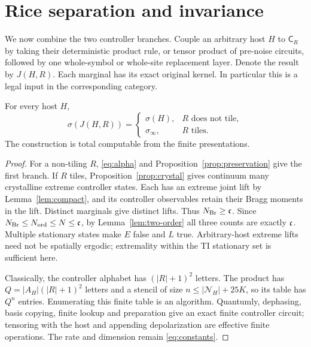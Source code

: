 \section{Rice separation and invariance}\label{sec:rice}
We now combine the two controller branches. Couple an arbitrary host $H$ to $\mathsf C_R$ by taking their deterministic product rule, or tensor product of pre-noise circuits, followed by one whole-symbol or whole-site replacement layer. Denote the result by $J(H,R)$. Each marginal has its exact original kernel. In particular this is a legal input in the corresponding category.

\begin{proposition}\label{prop:branches}
For every host $H$,
\[
 \sigma(J(H,R))=
 \begin{cases}
 \sigma(H),&R\text{ does not tile},\\
 \sigma_\infty,&R\text{ tiles}.
 \end{cases}
\]
The construction is total computable from the finite presentations.
\end{proposition}
\begin{proof}
For a non-tiling $R$, \eqref{eq:alpha} and Proposition~\ref{prop:preservation} give the first branch. If $R$ tiles, Proposition~\ref{prop:crystal} gives continuum many crystalline extreme controller states. Each has an extreme joint lift by Lemma~\ref{lem:compact}, and its controller observables retain their Bragg moments in the lift. Distinct marginals give distinct lifts. Thus
$N_{\mathrm{Br}}\ge\mathfrak c$. Since $N_{\mathrm{Br}}\le N_{\mathrm{ord}}\le N\le\mathfrak c$, by Lemma~\ref{lem:two-order} all three counts are exactly $\mathfrak c$. Multiple stationary states make $E$ false and $L$ true. Arbitrary-host extreme lifts need not be spatially ergodic; extremality within the TI stationary set is sufficient here.

Classically, the controller alphabet has $(|R|+1)^2$ letters. The product has $Q=|A_H|(|R|+1)^2$ letters and a stencil of size $n\le|\mathcal N_H|+25K$, so its table has $Q^n$ entries. Enumerating this finite table is an algorithm. Quantumly, dephasing, basis copying, finite lookup and preparation give an exact finite controller circuit; tensoring with the host and appending depolarization are effective finite operations. The rate and dimension remain \eqref{eq:constants}.
\end{proof}

